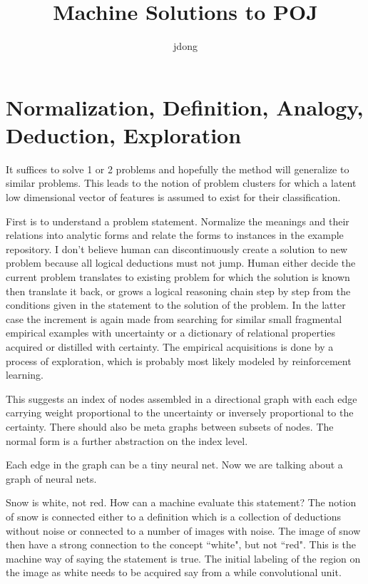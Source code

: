 \documentclass{article}
\title{Machine Solutions to POJ}
\author{jdong}
\numberwithin{equation}{subsection}
\begin{document}
\maketitle
{}
\section{Normalization, Definition, Analogy, Deduction, Exploration}
	It suffices to solve 1 or 2 problems and hopefully the method will generalize to similar problems. This leads to the notion of problem clusters for which a latent low dimensional vector of features is assumed to exist for their classification.
	
	First is to understand a problem statement. Normalize the meanings and their relations into analytic forms and relate the forms to instances in the example repository. I don't believe human can discontinuously create a solution to new problem because all logical deductions must not jump. Human either decide the current problem translates to existing problem for which the solution is known then translate it back, or grows a logical reasoning chain step by step from the conditions given in the statement to the solution of the problem. In the latter case the increment is again made from searching for similar small fragmental empirical examples with uncertainty or a dictionary of relational properties acquired or distilled with certainty. The empirical acquisitions is done by a process of exploration, which is probably most likely modeled by reinforcement learning.
	
	This suggests an index of nodes assembled in a directional graph with each edge carrying weight proportional to the uncertainty or inversely proportional to the certainty. There should also be meta graphs between subsets of nodes. The normal form is a further abstraction on the index level.
	
	Each edge in the graph can be a tiny neural net. Now we are talking about a graph of neural nets.
	
	Snow is white, not red. How can a machine evaluate this statement? The notion of snow is connected either to a definition which is a collection of deductions without noise or connected to a number of images with noise. The image of snow then have a strong connection to the concept ``white", but not ``red". This is the machine way of saying the statement is true. The initial labeling of the region on the image as white needs to be acquired say from a while convolutional unit. 
	
\end{document}
